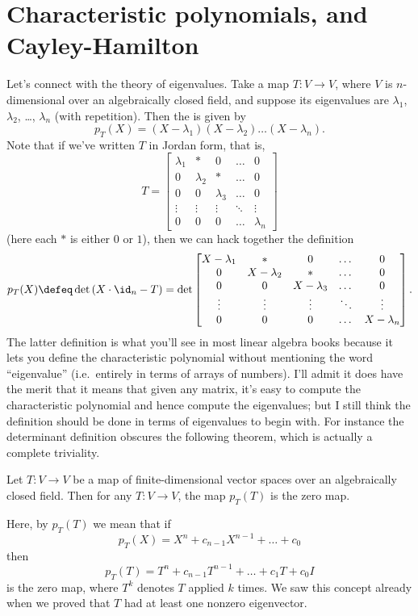 \section{Characteristic polynomials, and Cayley-Hamilton}
Let's connect with the theory of eigenvalues.
Take a map $T \colon V \to V$, where $V$ is $n$-dimensional
over an algebraically closed field,
and suppose its eigenvalues
are $\lambda_1$, $\lambda_2$, \dots, $\lambda_n$ (with repetition).
Then the  is given by
\[
	p_T(X) = (X-\lambda_1)(X-\lambda_2) \dots (X-\lambda_n).
\]
Note that if we've written $T$ in Jordan form, that is,
\[
	T = \begin{bmatrix}
		\lambda_1 & \ast & 0 & \dots & 0 \\
		0 & \lambda_2 & \ast & \dots & 0 \\
		0 & 0 & \lambda_3 & \dots & 0 \\
		\vdots & \vdots & \vdots & \ddots & \vdots \\
		0 & 0 & 0 & \dots & \lambda_n
	\end{bmatrix}
\]
(here each $\ast$ is either $0$ or $1$),
then we can hack together the definition
\[
	p_T(X) \defeq
	\det \left( X \cdot \id_n - T \right)
	= \det \begin{bmatrix}
		X - \lambda_1 & \ast & 0 & \dots & 0 \\
		0 & X - \lambda_2 & \ast & \dots & 0 \\
		0 & 0 & X - \lambda_3 & \dots & 0 \\
		\vdots & \vdots & \vdots & \ddots & \vdots \\
		0 & 0 & 0 & \dots & X - \lambda_n
	\end{bmatrix}.
\]
The latter definition is what you'll see in most
linear algebra books because it lets you define the characteristic polynomial
without mentioning the word ``eigenvalue''
(i.e.\ entirely in terms of arrays of numbers).
I'll admit it does have the merit that it means that given any matrix,
it's easy to compute the characteristic polynomial and hence
compute the eigenvalues;
but I still think the definition should be done in terms of
eigenvalues to begin with.
For instance the determinant definition obscures the following theorem,
which is actually a complete triviality.
\begin{theorem}
	Let $T \colon V \to V$ be a map of finite-dimensional
	vector spaces over an algebraically closed field.
	Then for any $T \colon V \to V$,
	the map $p_T(T)$ is the zero map.
\end{theorem}
Here, by $p_T(T)$ we mean that if
\[ p_T(X) = X^n + c_{n-1} X^{n-1} + \dots + c_0 \]
then \[ p_T(T) = T^n + c_{n-1} T^{n-1} + \dots + c_1 T +  c_0 I \]
is the zero map,
where $T^k$ denotes $T$ applied $k$ times.
We saw this concept already when we proved
that $T$ had at least one nonzero eigenvector.

